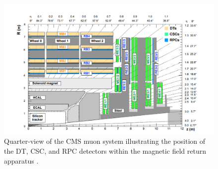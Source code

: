 \begin{figure}[htb]
\centering
  \includegraphics[width=0.7\linewidth]{plots/CMS/cmsmuon.png}
  \caption{Quarter-view of the CMS muon system illustrating the position of the DT, CSC, and RPC detectors within the magnetic field return apparatus \protect\cite{Chatrchyan:2013sba}.}
  \label{fig:cms:muons}
\end{figure}